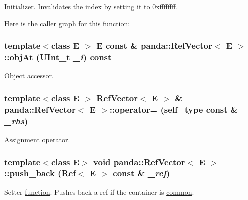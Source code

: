 Initializer. Invalidates the index by setting it to 0xffffffff. 

Here is the caller graph for this function:\hypertarget{classpanda_1_1RefVector_aac3407b681f83ec3ec19009c564b94ab}{
\subsubsection[{objAt}]{\setlength{\rightskip}{0pt plus 5cm}template$<$class E $>$ E const \& {\bf panda::RefVector}$<$ E $>$::objAt (UInt\_\-t {\em \_\-i}) const}}
\label{classpanda_1_1RefVector_aac3407b681f83ec3ec19009c564b94ab}


\hyperlink{classpanda_1_1Object}{Object} accessor. \hypertarget{classpanda_1_1RefVector_a8c6589a33d3c659522c94de51af29f6e}{
\subsubsection[{operator=}]{\setlength{\rightskip}{0pt plus 5cm}template$<$class E $>$ {\bf RefVector}$<$ E $>$ \& {\bf panda::RefVector}$<$ E $>$::operator= ({\bf self\_\-type} const \& {\em \_\-rhs})}}
\label{classpanda_1_1RefVector_a8c6589a33d3c659522c94de51af29f6e}


Assignment operator. \hypertarget{classpanda_1_1RefVector_a7e4767b46e857db8d68c4493cd166b4f}{
\subsubsection[{push\_\-back}]{\setlength{\rightskip}{0pt plus 5cm}template$<$class E$>$ void {\bf panda::RefVector}$<$ E $>$::push\_\-back ({\bf Ref}$<$ E $>$ const \& {\em \_\-ref})}}
\label{classpanda_1_1RefVector_a7e4767b46e857db8d68c4493cd166b4f}


Setter \hyperlink{namespacepanda_1_1function}{function}. Pushes back a ref if the container is \hyperlink{namespacepanda_1_1common}{common}. 

